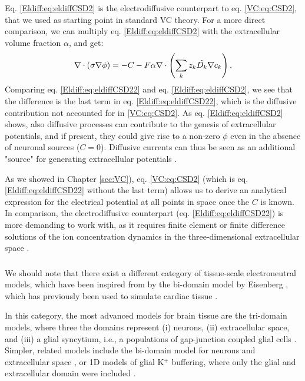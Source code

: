 \subsubsection{}
Eq. \ref{Eldiff:eq:eldiffCSD2} is the electrodiffusive counterpart to eq. \ref{VC:eq:CSD2}, that we used as starting point in standard VC theory. For a more direct comparison, we can multiply eq.  \ref{Eldiff:eq:eldiffCSD2} with the extracellular volume fraction $\alpha$, and get:
\begin{equation}
\nabla \cdot (\sigma\nabla\phi) = - C - F\alpha \nabla \cdot \left (\sum_k{z_k \tilde{D_k}{\bf \nabla} c_{k}} \right).
\label{Eldiff:eq:eldiffCSD22}
\end{equation}
Comparing eq. \ref{Eldiff:eq:eldiffCSD22} and eq.  \ref{Eldiff:eq:eldiffCSD2}, we see that the difference is the last term in eq. \ref{Eldiff:eq:eldiffCSD22}, which is the diffusive contribution not accounted for in \ref{VC:eq:CSD2}. As eq. \ref{Eldiff:eq:eldiffCSD2} shows, also diffusive processes can contribute to the genesis of extracellular potentials, and if present, they could give rise to a non-zero $\phi$ even in the absence of neuronal sources ($C = 0$). Diffusive currents can thus be seen as an additional "source" for generating extracellular potentials \citep{Halnes2017}. 

As we showed in Chapter \ref{sec:VC}), eq. \ref{VC:eq:CSD2} (which is eq.  \ref{Eldiff:eq:eldiffCSD22} without the last term) allows us to derive an analytical expression for the electrical potential at all points in space once the $C$ is known. In comparison, the electrodiffusive counterpart (eq. \ref{Eldiff:eq:eldiffCSD22}) is more demanding to work with, as it requires finite element or finite difference solutions of the ion concentration dynamics in the three-dimensional extracellular space \cite{Solbra2018}. 


\subsubsection{}
\label{sec:Eldiff:domain}
We should note that there exist a different category of tissue-scale electroneutral models, which have been inspired from by the bi-domain model by Eisenberg \citep{eisenberg1970}, which has previously been used to simulate cardiac tissue \citep{henriquez1993, sundnes2006, Mori2008}. 

In this category, the most advanced models for brain tissue are the tri-domain models, where three the domains represent (i) neurons, (ii) extracellular space, and (iii) a glial syncytium, i.e., a populations of gap-junction coupled glial cells \citep{OConnell2016, tuttle2019}. Simpler, related models include the bi-domain model for neurons and extracellular space \citep{Mori2015}, or 1D models of glial K$^+$ buffering, where only the glial and extracellular domain were included \cite{Gardner-Medwin1983, Chen2000, Halnes2013}.

